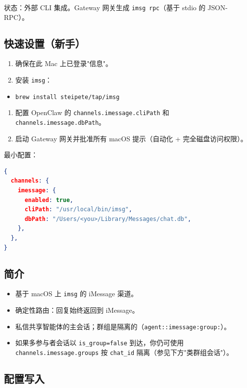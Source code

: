 状态：外部 CLI 集成。Gateway 网关生成 \texttt{imsg rpc}（基于 stdio 的 JSON-RPC）。

\subsection{快速设置（新手）}


\begin{enumerate}
  \item 确保在此 Mac 上已登录"信息"。
  \item 安装 \texttt{imsg}：
\end{enumerate}

\begin{itemize}
  \item \texttt{brew install steipete/tap/imsg}
\end{itemize}

\begin{enumerate}
  \item 配置 OpenClaw 的 \texttt{channels.imessage.cliPath} 和 \texttt{channels.imessage.dbPath}。
  \item 启动 Gateway 网关并批准所有 macOS 提示（自动化 + 完全磁盘访问权限）。
\end{enumerate}


最小配置：

\begin{lstlisting}[language=json]
{
  channels: {
    imessage: {
      enabled: true,
      cliPath: "/usr/local/bin/imsg",
      dbPath: "/Users/<you>/Library/Messages/chat.db",
    },
  },
}
\end{lstlisting}


\subsection{简介}


\begin{itemize}
  \item 基于 macOS 上 \texttt{imsg} 的 iMessage 渠道。
  \item 确定性路由：回复始终返回到 iMessage。
  \item 私信共享智能体的主会话；群组是隔离的（\texttt{agent::imessage:group:}）。
  \item 如果多参与者会话以 \texttt{is\_group=false} 到达，你仍可使用 \texttt{channels.imessage.groups} 按 \texttt{chat\_id} 隔离（参见下方"类群组会话"）。
\end{itemize}


\subsection{配置写入}


